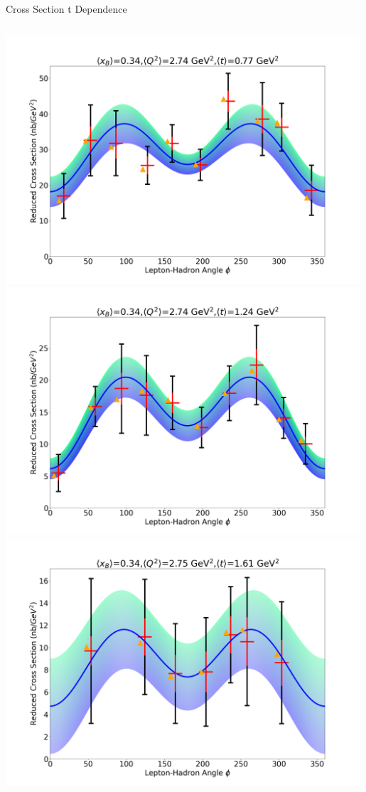 \documentclass[aspectratio=169]{beamer}
\begin{document}
\begin{frame}{Cross Section t Dependence }
\begin{columns}
            \includegraphics[width=0.99\textwidth]{defense/phi_fitting/xqt_302560.png}
            \includegraphics[width=0.99\textwidth]{defense/phi_fitting/xqt_3025100.png}
            \includegraphics[width=0.99\textwidth]{defense/phi_fitting/xqt_3025150.png}
            

\end{columns}
\end{frame}
\end{document}
